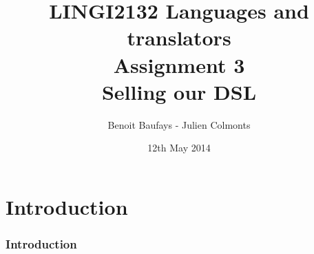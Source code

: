 \documentclass[usenames,dvipsnames]{beamer}
\title[LINGI2132 Assignment 3]{LINGI2132 Languages and translators \\ Assignment 3 \\ Selling our DSL} %
\author[Baufays - Colmonts] {Benoit Baufays - Julien Colmonts} %
\institute[INGI] %
{
Université Catholique de Louvain - INGI\\ %
\medskip
}
\date{12th May 2014} %
\begin{document}
\begin{frame}
\titlepage %
\end{frame}

\section{Introduction}
\begin{frame}
\frametitle{Introduction}
\end{frame}

 
%
%
\end{document}
